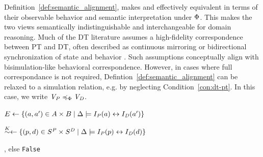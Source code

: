 Definition~\ref{def:semantic_alignment}, makes \VPT and \VDT effectively equivalent in terms of their observable behavior and semantic interpretation under $\Phi$. This makes the two views semantically indistinguishable and interchangeable for domain reasoning. Much of the DT literature assumes a high-fidelity correspondence between PT and DT, often described as continuous mirroring or bidirectional synchronization of state and behavior \cite{Kritzinger2018,Grieves2017Boschert2016,Tao2019}. Such assumptions conceptually align with bisimulation-like behavioral correspondence. However, in cases where full correspondance is not required, Defintion~\ref{def:semantic_alignment} can be relaxed to a simulation relation, e.g. by neglecting Condition~\ref{con:dt-pt}. In this case, we write $\mathit{V_P} \preccurlyeq_{\Phi} \mathit{V_D}$. 
\begin{algorithm}[t]
\caption{Semantic Alignment Check}\label{alg:semantic-alignment}
\DontPrintSemicolon
{}
\KwIn{$\VPT$, $\VDT$, $\DomainKnowledge = (\Ontology, \{\IPT, \IDT\})$}
$E \gets \{(a, a') \in A \times B \mid \Delta \models I_{\mathit{P}}(a) \leftrightarrow I_{\mathit{D}}(a')\}$%

$\stackrel{K}{\sim} \gets \{(p, d) \in S^{\mathit{P}} \times S^{\mathit{D}} \mid \Delta \models I_{\mathit{P}}(p) \leftrightarrow I_{\mathit{D}}(d)\}$%

, else \texttt{False}\;
\end{algorithm}


